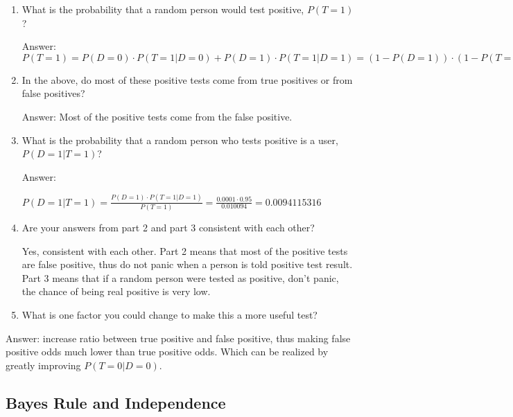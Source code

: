 \documentclass{article}
\def\blu#1{{\color{blu}#1}}
\begin{document}
\begin{enumerate}
\item What is the probability that a random person would test positive, $P(T=1)$?

\blu{Answer:} $ P(T=1)=P(D=0)\cdot P(T=1|D=0) + P(D=1)\cdot P(T=1|D=1) = (1-P(D=1))\cdot (1-P(T=0|D=0)) + P(D=1)\cdot P(T=1|D=1) = (1-0.0001)\cdot (1-0.99) + 0.0001\cdot 0.95 = 0.009999 + 0.000095=0.010094  $

\item In the above, do most of these positive tests come from true positives or from false positives? 

\blu{Answer:} Most of the positive tests come from the false positive.

\item What is the probability that a random person who tests positive is a user, $P(D=1|T=1)$?

\blu{Answer:}

$P(D=1|T=1)=\frac{P(D=1) \cdot P(T=1|D=1)}{P(T=1)}=\frac{0.0001 \cdot 0.95}{0.010094} =0.0094115316 $

\item Are your answers from part 2 and part 3 consistent with each other?

Yes, consistent with each other. Part 2 means that most of the positive tests are false positive, thus do not panic when a person is told positive test result. Part 3 means that if a random person were tested as positive, don't panic, the chance of being real positive is very low.


\item What is one factor you could change to make this a more useful test?
\end{enumerate}

Answer: increase ratio between true positive and false positive, thus making false positive odds much lower than true positive odds.
Which can be realized by greatly improving $P(T=0|D=0)$.

\subsection{Bayes Rule and Independence}
\end{document}
